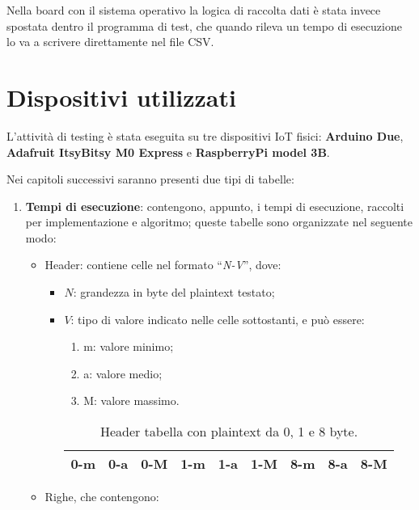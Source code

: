 \noindent Nella board con il sistema operativo la logica di raccolta dati è stata invece spostata dentro il programma di test, che quando rileva un tempo di esecuzione lo va a scrivere direttamente nel file CSV.

\newpage

\section{Dispositivi utilizzati}

L'attività di testing è stata eseguita su tre dispositivi IoT fisici: \textbf{Arduino Due}, \textbf{Adafruit ItsyBitsy M0 Express} e \textbf{RaspberryPi model 3B}.

\noindent Nei capitoli successivi saranno presenti due tipi di tabelle:
\begin{enumerate}[label=\Roman*.]
    \item \textbf{Tempi di esecuzione}: contengono, appunto, i tempi di esecuzione, raccolti per implementazione e algoritmo; queste tabelle sono organizzate nel seguente modo:
    \begin{itemize}
        \item Header: contiene celle nel formato ``\textit{N-V}'', dove:
        \begin{itemize}
            \item $N$: grandezza in byte del plaintext testato;
            \item $V$: tipo di valore indicato nelle celle sottostanti, e può essere:
            \begin{enumerate}[label=(\arabic*)]
                \item m: valore minimo;
                \item a: valore medio;
                \item M: valore massimo.
            \end{enumerate}
            \begin{table}[H]
                \centering
            	\begin{tabular}{|c|c|c|c|c|c|c|c|c|}
            		\hline
            		0-m & 0-a & 0-M & 1-m & 1-a & 1-M & 8-m & 8-a & 8-M \\
            		\hline
                \end{tabular}
                \caption{Header tabella con plaintext da 0, 1 e 8 byte.}
            \end{table}
        \end{itemize}
        \item Righe, che contengono:

\end{itemize}
\end{enumerate}
